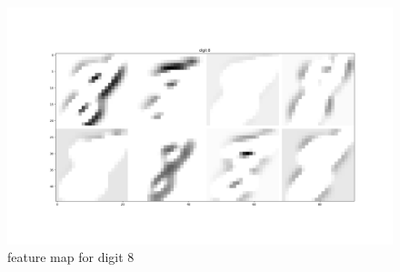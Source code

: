 \documentclass[12pt]{article}
\begin{document}
\begin{figure}[h]
    \centering
    \includegraphics [scale=0.3]{digit8.png}
    \caption {feature map for digit 8}
\end{figure}
\clearpage
\end{document}
